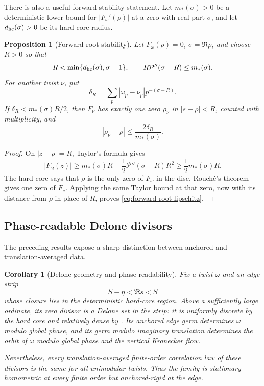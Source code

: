 \documentclass[11pt]{article}
\newtheorem{proposition}[theorem]{Proposition}
\newtheorem{corollary}[theorem]{Corollary}
\theoremstyle{definition}
\theoremstyle{remark}
\newcommand{\cP}{\mathcal P}
\begin{document}
There is also a useful forward stability statement.  Let $m_*(\sigma)>0$
be a deterministic lower bound for $|F_\omega'(\rho)|$ at a zero with
real part $\sigma$, and let $d_{\rm hc}(\sigma)>0$ be its hard-core
radius.

\begin{proposition}[Forward root stability]
\label{prop:forward-root-stability}
Let $F_\omega(\rho)=0$, $\sigma=\Re\rho$, and choose $R>0$ so that
\begin{equation}
 R<\min\{d_{\rm hc}(\sigma),\sigma-1\},
 \qquad
 R\cP''(\sigma-R)\le m_*(\sigma).
 \label{eq:root-stability-radius}
\end{equation}
For another twist $\nu$, put
\[
 \delta_R=\sum_p|\omega_p-\nu_p|p^{-(\sigma-R)}.
\]
If $\delta_R<m_*(\sigma)R/2$, then $F_\nu$ has exactly one zero
$\rho_\nu$ in $|s-\rho|<R$, counted with multiplicity, and
\begin{equation}
 |\rho_\nu-\rho|\le\frac{2\delta_R}{m_*(\sigma)}.
 \label{eq:forward-root-lipschitz}
\end{equation}
\end{proposition}

\begin{proof}
On $|z-\rho|=R$, Taylor's formula gives
\[
 |F_\omega(z)|
 \ge m_*(\sigma)R-\frac12\cP''(\sigma-R)R^2
 \ge\frac12m_*(\sigma)R.
\]
The hard core says that $\rho$ is the only zero of $F_\omega$ in the
disc.  Rouch\'e's theorem gives one zero of $F_\nu$.  Applying the same
Taylor bound at that zero, now with its distance from $\rho$ in place of
$R$, proves \eqref{eq:forward-root-lipschitz}.
\end{proof}

\subsection{Phase-readable Delone divisors}

The preceding results expose a sharp distinction between anchored and
translation-averaged data.

\begin{corollary}[Delone geometry and phase readability]
\label{cor:phase-readable-delone}
Fix a twist $\omega$ and an edge strip
\[
 S-\eta<\Re s<S
\]
whose closure lies in the deterministic hard-core region.  Above a
sufficiently large ordinate, its zero divisor is a Delone set in the
strip: it is uniformly discrete by the hard core and relatively dense
by .  Its anchored edge germ determines
$\omega$ modulo global phase, and its germ modulo imaginary translation
determines the orbit of $\omega$ modulo global phase and the vertical
Kronecker flow.

Nevertheless, every translation-averaged finite-order correlation law
of these divisors is the same for all unimodular twists.  Thus the family
is stationary-homometric at every finite order but anchored-rigid at the
edge.
\end{corollary}
\end{document}
